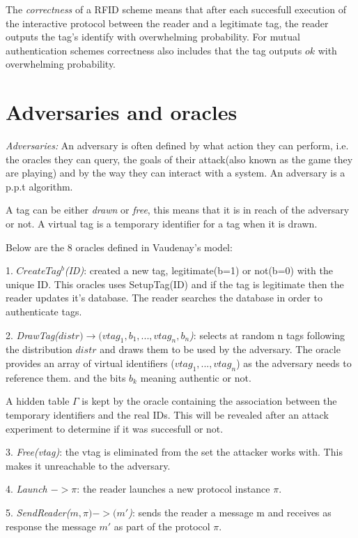     The \textit{correctness} of a RFID scheme means that after each succesfull execution of the interactive protocol between the reader and a 
    legitimate tag, the reader outputs the tag's identify with overwhelming probability. For mutual authentication schemes correctness also includes
    that the tag outputs $ok$ with overwhelming probability.

\section{Adversaries and oracles}

    \textit{Adversaries:} An adversary is often defined by what action they can perform, i.e. the oracles they can query, 
    the goals of their attack(also known as the game they are playing) and by the way they can interact with a system. An adversary
    is a p.p.t algorithm.
    
    A tag can be either \textit{drawn} or \textit{free}, this means that it is in reach of the 
    adversary or not. A virtual tag is a temporary identifier for a tag when it is drawn.

    Below are the 8 oracles defined in Vaudenay's model:

    1. \textit{$CreateTag^b$(ID)}: created a new tag, legitimate(b=1) or not(b=0) with the unique ID.
        This oracles uses SetupTag(ID) and if the tag is legitimate then the reader 
        updates it's database. The reader searches the database in order to authenticate tags.
    
    2. \textit{DrawTag($distr) \rightarrow (vtag_1, b_1, ... , vtag_n, b_n$)}: selects at random n tags following the 
    distribution $distr$ and draws them to be used by the adversary. The oracle provides
    an array of virtual identifiers ($vtag_1, ... ,vtag_n$) as the adversary needs to reference them.
    and the bits $b_k$ meaning authentic or not. 
    
    A hidden table $\Gamma$ is kept by the oracle containing the association between the temporary identifiers and the real IDs.
    This will be revealed after an attack experiment to determine if it was succesfull or not.

    3. \textit{Free(vtag)}: the vtag is eliminated from the set the attacker works with. This makes it unreachable to the adversary.
    
    4. \textit{Launch $-> \pi$}: the reader launches a new protocol instance $\pi$.

    5. \textit{SendReader($m, \pi) -> (m'$)}: sends the reader a message m and receives as response 
    the message $m'$ as part of the protocol $\pi$.

